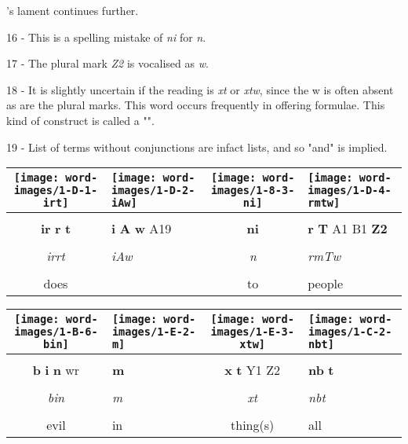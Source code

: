 \vspace*{\fill}

\pagebreak

\vspace*{\fill}

's lament continues further.

\vspace*{\fill}

16 - This is a spelling mistake of \textit{ni} for \textit{n}.

17 - The plural mark \textit{Z2} is vocalised as \textit{w}.

18 - It is slightly uncertain if the reading is \textit{xt} or \textit{xtw}, since the w is often absent as are the plural marks. This word occurs frequently in offering formulae. This kind of construct is called a "".

19 - List of terms without conjunctions are infact lists, and so "and" is implied.

\vspace*{\fill}

\pagebreak

\vspace*{\fill}

\begin{tabularx}{\linewidth}{cYcY}
	\texttt{[image: word-images/1-D-1-irt]} &
	\texttt{[image: word-images/1-D-2-iAw]} &
	\texttt{[image: word-images/1-8-3-ni]} &
	\texttt{[image: word-images/1-D-4-rmtw]} \\
	\hline \\ 
	\textbf{ir} \textbf{r} \textbf{t} &
	\textbf{i} \textbf{A} \textbf{w} A19 &
	\textbf{ni} &
	\textbf{r} \textbf{T} A1 B1 \textbf{Z2} \\
	\hline \\ 
	\textit{irrt} & \textit{iAw} & \textit{n} & \textit{rmTw} \\
	\hline \\ 
	does &  & to & people
\end{tabularx}

\vspace{7.5mm}

\begin{tabularx}{\linewidth}{cYcY}
	\texttt{[image: word-images/1-B-6-bin]} &
	\texttt{[image: word-images/1-E-2-m]} &
	\texttt{[image: word-images/1-E-3-xtw]} &
	\texttt{[image: word-images/1-C-2-nbt]} \\
	\hline \\ 
	\textbf{b} \textbf{i} \textbf{n} wr &
	\textbf{m} &
	\textbf{x} \textbf{t} Y1 Z2 &
	\textbf{nb} \textbf{t} \\
	\hline \\ 
	\textit{bin} & \textit{m} & \textit{xt} & \textit{nbt} \\
	\hline \\ 
	evil & in & thing(s) & all
\end{tabularx}

